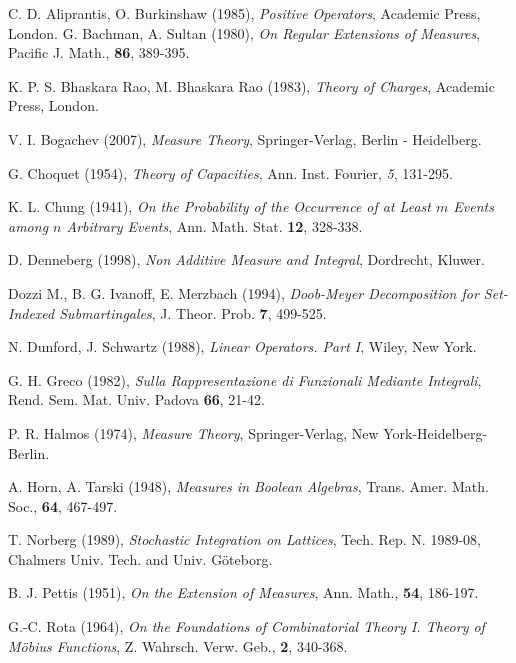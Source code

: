 \documentclass[11pt]{amsart}
\theoremstyle{plain}
\begin{document}
\begin{thebibliography}{99} 
 C. D. Aliprantis, O. Burkinshaw (1985), \textit{Positive Operators},
Academic Press, London.
 G. Bachman, A. Sultan (1980), \textit{On Regular Extensions 
of Measures}, Pacific J. Math., \textbf{86}, 389-395.

 K. P. S. Bhaskara Rao, M. Bhaskara Rao (1983), \textit{Theory of Charges}, 
Academic Press, London.

 V. I. Bogachev (2007), \textit{Measure Theory}, Springer-Verlag, 
Berlin - Heidelberg.

 G. Choquet (1954), \textit{Theory of Capacities}, Ann. Inst. Fourier,
\textit{5}, 131-295.

 K. L. Chung (1941), \textit{On the Probability of the Occurrence of at 
Least $m$ Events among $n$ Arbitrary Events}, Ann. Math. Stat. \textbf{12}, 328-338.

 D. Denneberg (1998), \textit{Non Additive Measure and Integral},
Dordrecht, Kluwer.

 Dozzi M., B. G. Ivanoff, E. Merzbach (1994), \textit{Doob-Meyer 
Decomposition for Set-Indexed Submartingales}, J. Theor. Prob. \textbf 7, 499-525.

 N. Dunford, J. Schwartz (1988), \textit{Linear Operators. Part I}, Wiley, 
New York.

 G. H. Greco (1982), \textit{Sulla Rappresentazione di Funzionali
Mediante Integrali}, Rend. Sem. Mat. Univ. Padova \textbf{66}, 21-42.

 P. R. Halmos (1974), \textit{Measure Theory}, Springer-Verlag, New 
York-Heidelberg-Berlin.

 A. Horn, A. Tarski (1948), \textit{Measures in Boolean Algebras}, 
Trans. Amer. Math. Soc., \textbf{64}, 467-497.

 T. Norberg (1989), \textit{Stochastic Integration on Lattices}, Tech. 
Rep. N. 1989-08, Chalmers Univ. Tech. and Univ. G\"{o}teborg.

 B. J. Pettis (1951), \textit{On the Extension of Measures}, Ann. Math., 
\textbf{54}, 186-197.

 G.-C. Rota (1964), \textit{On the Foundations of Combinatorial Theory I. 
Theory of M\"{o}bius Functions}, Z. Wahrsch. Verw. Geb., \textbf{2}, 340-368.
\end{thebibliography}
\end{document}
